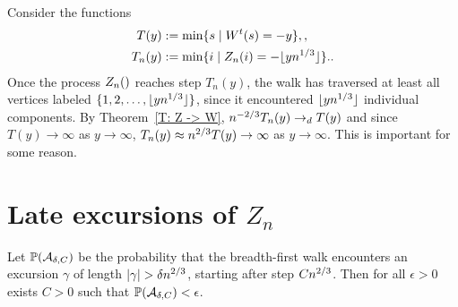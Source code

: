 Consider the functions
\begin{align}
T(y) &:= \min \{s \;|\; W^t(s)=-y\}, \label{E: def T(y)}, \\
T_n(y) &:= \min\{i \;|\; Z_n(i)=-\lfloor yn^{1 / 3}\rfloor \}. \label{E: def Tn(y)}.
\end{align}
Once the process $\Zn$ reaches step $T_n(y)$, 
the walk has traversed at least all vertices labeled $\{1,2,\dots,\lfloor yn^{1 / 3}\rfloor\}$,
since it encountered $\lfloor yn^{1 / 3}\rfloor$ individual components.
By Theorem~\ref{T: Z -> W}, $n^{-2 / 3}T_n(y) \rightarrow_d T(y)$
and since $T(y) \rightarrow \infty$ as $y\rightarrow\infty$,
$T_n(y) \approx n^{2 / 3}T(y) \rightarrow\infty$ as $y\rightarrow \infty$.
This is important for some reason.


\section{Late excursions of $Z_n$}

\begin{lemma}
	Let 
	$\mathbb{P}(\mathcal{A}_{\delta, C})$ 
	be the probability that the breadth-first walk encounters an excursion $\gamma$ of length 
	$|\gamma| > \delta n^{2 / 3}$, starting after step $Cn^{2 / 3}$.
	Then for all $\epsilon>0$ exists $C>0$ such that $\mathbb{P}(\mathcal{A}_{\delta, C}) < \epsilon$. 
\end{lemma}

